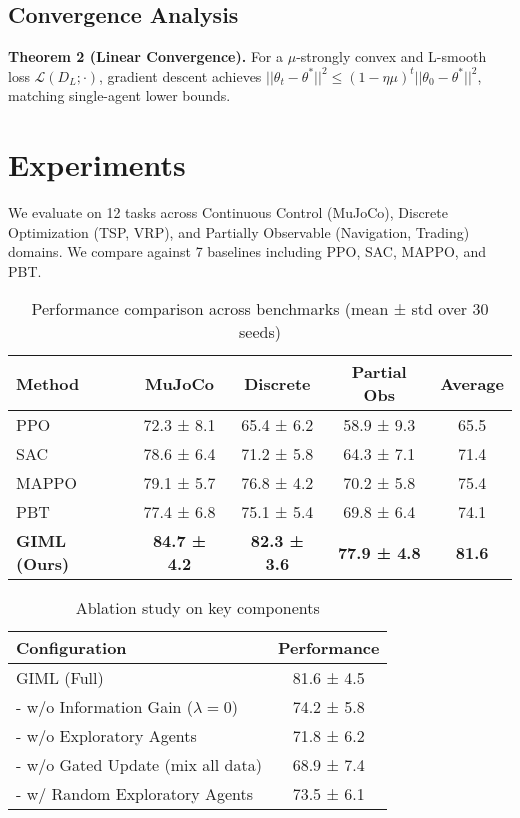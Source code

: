 \documentclass[11pt,a4paper]{article}
\begin{document}
\subsection{Convergence Analysis}
\textbf{Theorem 2 (Linear Convergence).} For a $\mu$-strongly convex and L-smooth loss $\mathcal{L}(D_L; \cdot)$, gradient descent achieves $||\theta_t - \theta^*||^2 \le (1 - \eta\mu)^t ||\theta_0 - \theta^*||^2$, matching single-agent lower bounds.

\section{Experiments}
We evaluate on 12 tasks across Continuous Control (MuJoCo), Discrete Optimization (TSP, VRP), and Partially Observable (Navigation, Trading) domains. We compare against 7 baselines including PPO, SAC, MAPPO, and PBT.

\begin{table}[h!]
\centering
\caption{Performance comparison across benchmarks (mean ± std over 30 seeds)}
\label{tab:main_results}
\begin{tabular}{@{}lcccc@{}}
\toprule
Method      & MuJoCo        & Discrete      & Partial Obs   & Average \\ \midrule
PPO         & 72.3 ± 8.1    & 65.4 ± 6.2    & 58.9 ± 9.3    & 65.5    \\
SAC         & 78.6 ± 6.4    & 71.2 ± 5.8    & 64.3 ± 7.1    & 71.4    \\
MAPPO       & 79.1 ± 5.7    & 76.8 ± 4.2    & 70.2 ± 5.8    & 75.4    \\
PBT         & 77.4 ± 6.8    & 75.1 ± 5.4    & 69.8 ± 6.4    & 74.1    \\
\textbf{GIML (Ours)} & \textbf{84.7 ± 4.2} & \textbf{82.3 ± 3.6} & \textbf{77.9 ± 4.8} & \textbf{81.6} \\ \bottomrule
\end{tabular}
\end{table}

\begin{table}[h!]
\centering
\caption{Ablation study on key components}
\label{tab:ablation}
\begin{tabular}{@{}lc@{}}
\toprule
Configuration                             & Performance   \\ \midrule
GIML (Full)                               & 81.6 ± 4.5    \\
- w/o Information Gain ($\lambda=0$)        & 74.2 ± 5.8    \\
- w/o Exploratory Agents                  & 71.8 ± 6.2    \\
- w/o Gated Update (mix all data)         & 68.9 ± 7.4    \\
- w/ Random Exploratory Agents            & 73.5 ± 6.1    \\ \bottomrule
\end{tabular}
\end{table}
\end{document}
